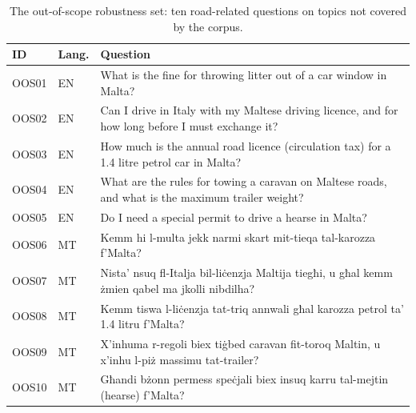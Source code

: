 \begin{table}[H]
\centering
\caption{The out-of-scope robustness set: ten road-related questions on topics not covered by the corpus.}
\label{tab:oos-questions}
{\footnotesize{}
\def\arraystretch{1.15}
\begin{tabularx}{\textwidth}{@{}l l >{\raggedright\arraybackslash}X@{}}
\toprule
\textbf{ID} & \textbf{Lang.} & \textbf{Question} \\
\midrule
OOS01 & EN & What is the fine for throwing litter out of a car window in Malta? \\
OOS02 & EN & Can I drive in Italy with my Maltese driving licence, and for how long before I must exchange it? \\
OOS03 & EN & How much is the annual road licence (circulation tax) for a 1.4 litre petrol car in Malta? \\
OOS04 & EN & What are the rules for towing a caravan on Maltese roads, and what is the maximum trailer weight? \\
OOS05 & EN & Do I need a special permit to drive a hearse in Malta? \\
OOS06 & MT & Kemm hi l-multa jekk narmi skart mit-tieqa tal-karozza f'Malta? \\
OOS07 & MT & Nista' nsuq fl-Italja bil-liċenzja Maltija tiegħi, u għal kemm żmien qabel ma jkolli nibdilha? \\
OOS08 & MT & Kemm tiswa l-liċenzja tat-triq annwali għal karozza petrol ta' 1.4 litru f'Malta? \\
OOS09 & MT & X'inhuma r-regoli biex tiġbed caravan fit-toroq Maltin, u x'inhu l-piż massimu tat-trailer? \\
OOS10 & MT & Għandi bżonn permess speċjali biex insuq karru tal-mejtin (hearse) f'Malta? \\
\bottomrule
\end{tabularx}}
\end{table}
